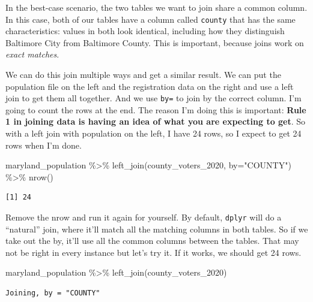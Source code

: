\documentclass[
  letterpaper,
  DIV=11,
  numbers=noendperiod]{scrreprt}
\newenvironment{Shaded}{\begin{snugshade}}{\end{snugshade}}
\newcommand{\AttributeTok}[1]{\textcolor[rgb]{0.40,0.45,0.13}{#1}}
\newcommand{\FunctionTok}[1]{\textcolor[rgb]{0.28,0.35,0.67}{#1}}
\newcommand{\NormalTok}[1]{\textcolor[rgb]{0.00,0.23,0.31}{#1}}
\newcommand{\SpecialCharTok}[1]{\textcolor[rgb]{0.37,0.37,0.37}{#1}}
\newcommand{\StringTok}[1]{\textcolor[rgb]{0.13,0.47,0.30}{#1}}
\begin{document}
In the best-case scenario, the two tables we want to join share a common
column. In this case, both of our tables have a column called
\texttt{county} that has the same characteristics: values in both look
identical, including how they distinguish Baltimore City from Baltimore
County. This is important, because joins work on \emph{exact matches}.

We can do this join multiple ways and get a similar result. We can put
the population file on the left and the registration data on the right
and use a left join to get them all together. And we use \texttt{by=} to
join by the correct column. I'm going to count the rows at the end. The
reason I'm doing this is important: \textbf{Rule 1 in joining data is
having an idea of what you are expecting to get}. So with a left join
with population on the left, I have 24 rows, so I expect to get 24 rows
when I'm done.

\begin{Shaded}
\begin{Highlighting}[]
\NormalTok{maryland\_population }\SpecialCharTok{\%\textgreater{}\%} \FunctionTok{left\_join}\NormalTok{(county\_voters\_2020, }\AttributeTok{by=}\StringTok{"COUNTY"}\NormalTok{) }\SpecialCharTok{\%\textgreater{}\%} \FunctionTok{nrow}\NormalTok{()}
\end{Highlighting}
\end{Shaded}

\begin{verbatim}
[1] 24
\end{verbatim}

Remove the nrow and run it again for yourself. By default,
\texttt{dplyr} will do a ``natural'' join, where it'll match all the
matching columns in both tables. So if we take out the by, it'll use all
the common columns between the tables. That may not be right in every
instance but let's try it. If it works, we should get 24 rows.

\begin{Shaded}
\begin{Highlighting}[]
\NormalTok{maryland\_population }\SpecialCharTok{\%\textgreater{}\%} \FunctionTok{left\_join}\NormalTok{(county\_voters\_2020)}
\end{Highlighting}
\end{Shaded}

\begin{verbatim}
Joining, by = "COUNTY"
\end{verbatim}
\end{document}
